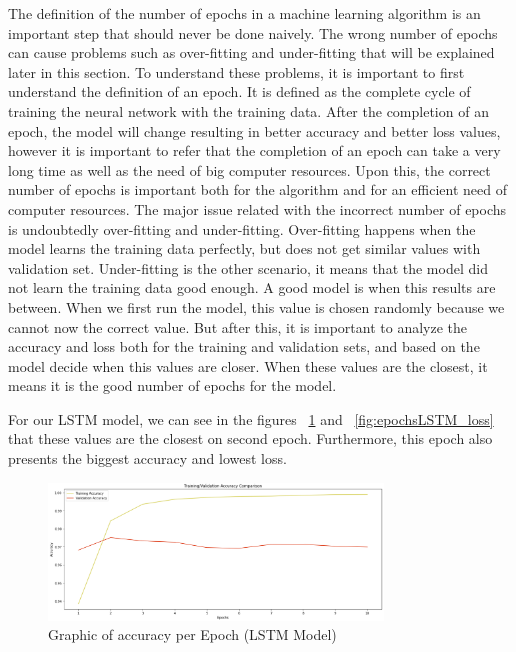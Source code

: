 \documentclass[conference]{IEEEtran}
\newcommand\tab[1][0.4cm]{\hspace*{#1}}
\begin{document}
The definition of the number of epochs in a machine learning algorithm is an important step that should never be done naively. The wrong number of epochs can cause problems such as over-fitting and under-fitting that will be explained later in this section. To understand these problems, it is important to first understand the definition of an epoch. It is defined as the complete cycle of training the neural network with the training data. After the completion of an epoch, the model will change resulting in better accuracy and better loss values, however it is important to refer that the completion of an epoch can take a very long time as well as the need of big computer resources. Upon this, the correct number of epochs is important both for the algorithm and for an efficient need of computer resources.
\linebreak
\tab The major issue related with the incorrect number of epochs is undoubtedly over-fitting and under-fitting. Over-fitting happens when the model learns the training data perfectly, but does not get similar values with validation set. Under-fitting is the other scenario, it means that the model did not learn the training data good enough. A good model is when this results are between.
When we first run the model, this value is chosen randomly because we cannot now the correct value. But after this, it is important to analyze the accuracy and loss both for the training and validation sets, and based on the model decide when this values are closer. When these values are the closest, it means it is the good number of epochs for the model.

For our LSTM model, we can see in the figures ~\ref{fig:epochsLSTM_acc} and ~\ref{fig:epochsLSTM_loss} that these values are the closest on second epoch. Furthermore, this epoch also presents the biggest accuracy and lowest loss.

\begin{figure}[H]
    \centering
    \includegraphics[width=3.5in]{pictures/model1_epochs_accuracy.png}
    \caption{Graphic of accuracy per Epoch (LSTM Model)}\label{fig:epochsLSTM_acc}
\end{figure}
\end{document}

